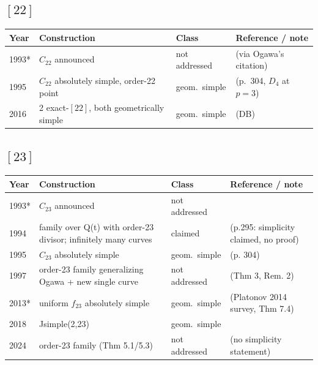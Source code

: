 \documentclass[10pt]{amsart}
\begin{document}
\subsection*{$[22]$}
\begin{longtable}{p{0.9cm} p{7.6cm} p{2.3cm} p{4.2cm}}
\hline Year & Construction & Class & Reference / note \\ \hline
1993* & $C_{22}$ announced & not addressed & \cite{Leprevost1993} (via Ogawa's citation)\\
1995 & $C_{22}$ absolutely simple, order-22 point & geom.\ simple & \cite{Leprevost1995} (p.\ 304, $D_4$ at $p{=}3$)\\
2016 & 2 exact-$[22]$, both geometrically simple & geom.\ simple & \cite{BSSVY} (DB)\\
\hline\end{longtable}
\subsection*{$[23]$}
\begin{longtable}{p{0.9cm} p{7.6cm} p{2.3cm} p{4.2cm}}
\hline Year & Construction & Class & Reference / note \\ \hline
1993* & $C_{23}$ announced & not addressed & \cite{Leprevost1993}\\
1994 & family over Q(t) with order-23 divisor; infinitely many curves & claimed & \cite{Ogawa1994} (p.295: simplicity claimed, no proof)\\
1995 & $C_{23}$ absolutely simple & geom.\ simple & \cite{Leprevost1995} (p. 304)\\
1997 & order-23 family generalizing Ogawa + new single curve & not addressed & \cite{Leprevost1997} (Thm 3, Rem. 2)\\
2013* & uniform $f_{23}$ absolutely simple & geom.\ simple & \cite{PZP2013} (Platonov 2014 survey, Thm 7.4)\\
2018 & Jsimple(2,23) & geom.\ simple & \cite{Nicholls2018}\\
2024 & order-23 family (Thm 5.1/5.3) & not addressed & \cite{SadekSuluyer2024} (no simplicity statement)\\
\hline\end{longtable}
\end{document}
